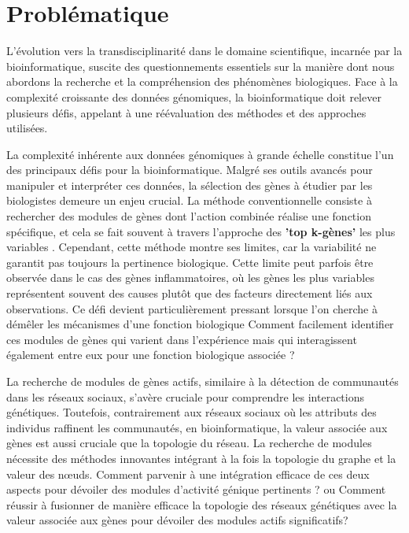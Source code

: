 \section{Problématique}

L'évolution vers la transdisciplinarité dans le domaine scientifique, incarnée par la bioinformatique, suscite des questionnements essentiels sur la manière dont nous abordons la recherche et la compréhension des phénomènes biologiques. Face à la complexité croissante des données génomiques, la bioinformatique doit relever plusieurs défis, appelant à une réévaluation des méthodes et des approches utilisées.

La complexité inhérente aux données génomiques à grande échelle constitue l'un des principaux défis pour la bioinformatique. Malgré ses outils avancés pour manipuler et interpréter ces données, la sélection des gènes à étudier  par les biologistes demeure un enjeu crucial. La méthode conventionnelle consiste à rechercher des modules de gènes dont l'action combinée réalise une fonction spécifique, et cela se fait souvent à travers l'approche des \textbf{'top k-gènes'} les plus variables \cite{Rapaport2007}. Cependant, cette méthode montre ses limites, car la variabilité ne garantit pas toujours la pertinence biologique. Cette limite peut parfois être observée dans le cas des gènes inflammatoires, où les gènes les plus variables représentent souvent des causes plutôt que des facteurs directement liés aux observations. Ce défi devient particulièrement pressant lorsque l'on cherche à démêler les mécanismes d'une fonction biologique 
Comment facilement identifier ces  modules de gènes qui varient dans l'expérience mais qui interagissent également entre eux pour une fonction biologique associée ?

La recherche de modules de gènes actifs, similaire à la détection de communautés dans les réseaux sociaux, s'avère cruciale pour comprendre les interactions génétiques. Toutefois, contrairement aux réseaux sociaux où les attributs des individus raffinent les communautés, en bioinformatique, la valeur associée aux gènes est aussi cruciale que la topologie du réseau. La recherche de modules nécessite des méthodes innovantes intégrant à la fois la topologie du graphe et la valeur des nœuds. Comment parvenir à une intégration efficace de ces deux aspects pour dévoiler des modules d'activité génique pertinents ? ou Comment réussir à fusionner de manière efficace la topologie des réseaux génétiques avec la valeur associée aux gènes pour dévoiler des modules actifs significatifs?



